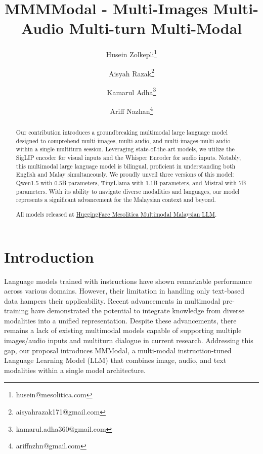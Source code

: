 \documentclass[preprint]{article}
\title{MMMModal - Multi-Images Multi-Audio Multi-turn Multi-Modal}
\author{
  Husein Zolkepli\thanks{husein@mesolitica.com} \and
  Aisyah Razak\thanks{aisyahrazak171@gmail.com} \and
  Kamarul Adha\thanks{kamarul.adha360@gmail.com} \and
  Ariff Nazhan\thanks{ariffnzhn@gmail.com}
}
\begin{document}
\maketitle

\begin{abstract}

  Our contribution introduces a groundbreaking multimodal large language model designed to comprehend multi-images, multi-audio, and multi-images-multi-audio within a single multiturn session. Leveraging state-of-the-art models, we utilize the SigLIP encoder for visual inputs and the Whisper Encoder for audio inputs. Notably, this multimodal large language model is bilingual, proficient in understanding both English and Malay simultaneously. We proudly unveil three versions of this model: Qwen1.5 with 0.5B parameters, TinyLlama with 1.1B parameters, and Mistral with 7B parameters. With its ability to navigate diverse modalities and languages, our model represents a significant advancement for the Malaysian context and beyond.

  All models released at \href{https://huggingface.co/collections/mesolitica/multimodal-malaysian-llm-65c6f893e03f78fa9e5c8859}{HuggingFace Mesolitica Multimodal Malaysian LLM}.

\end{abstract}

\section{Introduction}

Language models trained with instructions have shown remarkable performance across various domains. However, their limitation in handling only text-based data hampers their applicability. Recent advancements in multimodal pre-training have demonstrated the potential to integrate knowledge from diverse modalities into a unified representation.\cite{lyu2023macawllm}\cite{liu2023visual} Despite these advancements, there remains a lack of existing multimodal models capable of supporting multiple images/audio inputs and multiturn dialogue in current research. Addressing this gap, our proposal introduces MMModal, a multi-modal instruction-tuned Language Learning Model (LLM) that combines image, audio, and text modalities within a single model architecture.
\end{document}
